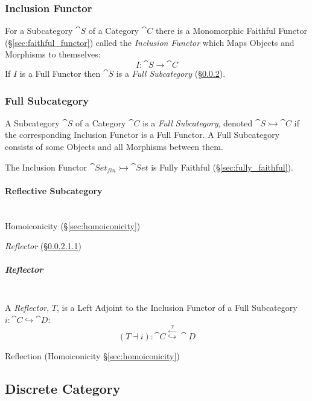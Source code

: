 \subsubsection{Inclusion Functor}\label{sec:inclusion_functor}

For a Subcategory $\cat{S}$ of a Category $\cat{C}$ there is a
Monomorphic Faithful Functor (\S\ref{sec:faithful_functor}) called the
\emph{Inclusion Functor} which Maps Objects and Morphisms to
themselves:
\[
  I : \cat{S} \rightarrow \cat{C}
\]
If $I$ is a Full Functor then $\cat{S}$ is a \emph{Full
  Subcategory} (\S\ref{sec:full_subcategory}).



\subsubsection{Full Subcategory}\label{sec:full_subcategory}

A Subcategory $\cat{S}$ of a Category $\cat{C}$ is a \emph{Full
  Subcategory}, denoted $\cat{S} \rightarrowtail \cat{C}$ if the
corresponding Inclusion Functor is a Full Functor. A Full Subcategory
consists of some Objects and all Morphisms between them.

The Inclusion Functor $\cat{Set}_{fin} \rightarrowtail
\cat{Set}$ is Fully Faithful (\S\ref{sec:fully_faithful}).



\paragraph{Reflective Subcategory}\label{sec:reflective_subcategory}
\hfill \\

Homoiconicity (\S\ref{sec:homoiconicity})

\emph{Reflector} (\S\ref{sec:reflector})


\subparagraph{Reflector}\label{sec:reflector}
\hfill \\


A \emph{Reflector}, $T$, is a Left Adjoint to the Inclusion Functor of
a Full Subcategory $i : \cat{C} \hookrightarrow \cat{D}$:
\[
  (T \dashv i) :
  \cat{C} \stackrel{\xleftarrow{T}}{\hookrightarrow} \cat{D}
\]

Reflection (Homoiconicity \S\ref{sec:homoiconicity})



\subsection{Discrete Category}\label{sec:discrete_category}

